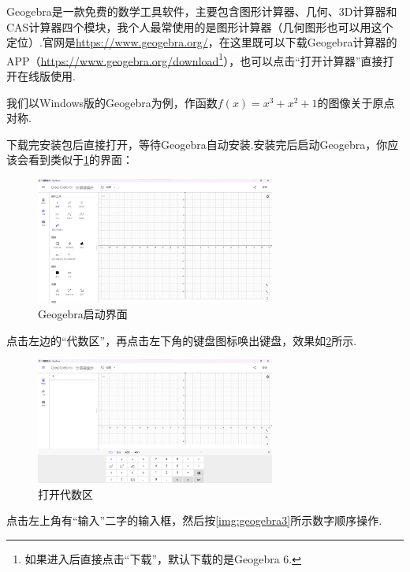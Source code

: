 \documentclass[lang=cn,math=cm,chinesefont=nofont,11pt,scheme=chinese,twocol]{elegantbook}
\begin{document}
Geogebra是一款免费的数学工具软件，主要包含图形计算器、几何、3D计算器和CAS计算器四个模块，我个人最常使用的是图形计算器（几何图形也可以用这个定位）.官网是\href{https://www.geogebra.org/}{https://www.geogebra.org/}，在这里既可以下载Geogebra计算器的APP（\href{https://www.geogebra.org/download}{https://www.geogebra.org/download}\footnote{如果进入后直接点击“下载”，默认下载的是Geogebra 6.}），也可以点击“打开计算器”直接打开在线版使用.

我们以Windows版的Geogebra为例，作函数$f(x)=x^3+x^2+1$的图像关于原点对称.

下载完安装包后直接打开，等待Geogebra自动安装.安装完后启动Geogebra，你应该会看到类似于\ref{img:geogebra1}的界面：

\begin{figure}[h]
  \centering
  \includegraphics[width=0.7\textwidth]{image/geogebra1.png}
  \caption{Geogebra启动界面}
  \label{img:geogebra1}
\end{figure}



\hspace*{\fill}

点击左边的“代数区”，再点击左下角的键盘图标唤出键盘，效果如\ref{img:geogebra2}所示.

\begin{figure}[h]
  \centering
  \includegraphics[width=0.7\textwidth]{image/geogebra2.png}
  \caption{打开代数区}
  \label{img:geogebra2}
\end{figure}

点击左上角有“输入”二字的输入框，然后按\ref{img:geogebra3}所示数字顺序操作.
\end{document}
